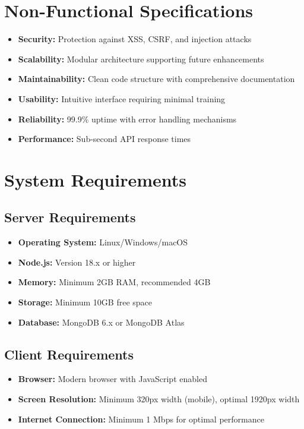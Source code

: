 \documentclass[12pt,a4paper]{report}
\begin{document}
\section{Non-Functional Specifications}
\begin{itemize}
    \item \textbf{Security:} Protection against XSS, CSRF, and injection attacks
    \item \textbf{Scalability:} Modular architecture supporting future enhancements
    \item \textbf{Maintainability:} Clean code structure with comprehensive documentation
    \item \textbf{Usability:} Intuitive interface requiring minimal training
    \item \textbf{Reliability:} 99.9\% uptime with error handling mechanisms
    \item \textbf{Performance:} Sub-second API response times
\end{itemize}

\section{System Requirements}
\subsection{Server Requirements}
\begin{itemize}
    \item \textbf{Operating System:} Linux/Windows/macOS
    \item \textbf{Node.js:} Version 18.x or higher
    \item \textbf{Memory:} Minimum 2GB RAM, recommended 4GB
    \item \textbf{Storage:} Minimum 10GB free space
    \item \textbf{Database:} MongoDB 6.x or MongoDB Atlas
\end{itemize}

\subsection{Client Requirements}
\begin{itemize}
    \item \textbf{Browser:} Modern browser with JavaScript enabled
    \item \textbf{Screen Resolution:} Minimum 320px width (mobile), optimal 1920px width
    \item \textbf{Internet Connection:} Minimum 1 Mbps for optimal performance
\end{itemize}
\end{document}

